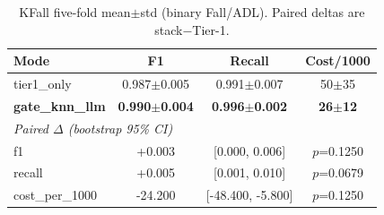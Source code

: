 \begin{table}[!t]
\centering
\caption{KFall five-fold mean$\pm$std (binary Fall/ADL). Paired deltas are stack$-$Tier-1.}
\label{tab:kfallmean}
\begin{tabular}{lccc}
\toprule
Mode & F1 & Recall & Cost/1000 \\
\midrule
tier1\_only & 0.987$\pm$0.005 & 0.991$\pm$0.007 & 50$\pm$35 \\
\textbf{gate\_knn\_llm} & \textbf{0.990$\pm$0.004} & \textbf{0.996$\pm$0.002} & \textbf{26$\pm$12} \\
\midrule
\multicolumn{4}{l}{\textit{Paired $\Delta$ (bootstrap 95\% CI)}} \\
f1 & +0.003 & [0.000, 0.006] & $p$=0.1250 \\
recall & +0.005 & [0.001, 0.010] & $p$=0.0679 \\
cost\_per\_1000 & -24.200 & [-48.400, -5.800] & $p$=0.1250 \\
\bottomrule
\end{tabular}
\end{table}
